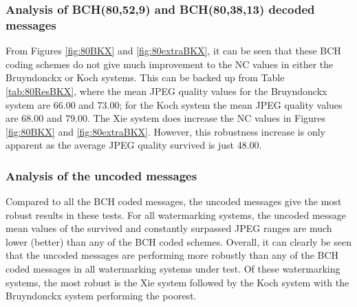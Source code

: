 \documentclass[12pt]{report}
\begin{document}
\subsubsection{Analysis of BCH(80,52,9) and BCH(80,38,13) decoded messages}
From Figures 
\ref{fig:80BKX} and \ref{fig:80extraBKX},
it can be seen that these BCH coding schemes do not give much improvement to the NC values in either the Bruyndonckx or Koch systems.
This can be backed up from Table \ref{tab:80ResBKX}, where the mean JPEG quality values for the Bruyndonckx 
system are 66.00 and 73.00; for the Koch system the mean JPEG quality values are 68.00 and 79.00.
The Xie system does increase the NC values in Figures
\ref{fig:80BKX} and \ref{fig:80extraBKX}.
However, this robustness increase is only apparent as the average JPEG quality survived is just 48.00. 

\subsubsection{Analysis of the uncoded messages}
Compared to all the BCH coded messages, the uncoded messages give the most robust 
results in these tests. 
For all watermarking systems, the uncoded message mean values of the survived and constantly surpassed JPEG ranges are much lower (better) than
any of the BCH coded schemes. Overall, it can clearly be seen that the uncoded messages are performing more robustly than any of the BCH coded messages
in all watermarking systems under test. Of these watermarking systems, the most robust is the Xie system followed by the Koch system with 
the Bruyndonckx system performing the poorest.
               
\end{document}
